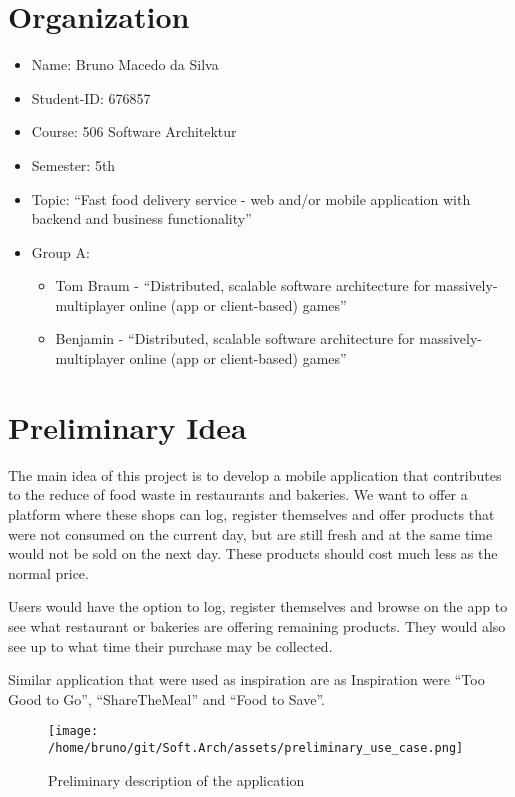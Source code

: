 \documentclass[pdftex, a4paper]{scrartcl}
\begin{document}
\section{Organization}

\begin{itemize}
    \item Name: Bruno Macedo da Silva
    \item Student-ID: 676857
    \item Course: 506 Software Architektur 
    \item Semester: 5th
    \item Topic: ``Fast food delivery service - web and/or mobile application with backend and business functionality''
    \item Group A: 
        \begin{itemize}
            \item Tom Braum - ``Distributed, scalable software architecture for massively-multiplayer online (app or 
            client-based) games''
            \item Benjamin - ``Distributed, scalable software architecture for massively-multiplayer online (app or 
            client-based) games''
        \end{itemize}
\end{itemize}

\section{Preliminary Idea}

The main idea of this project is to develop a mobile application that contributes to the reduce of food waste 
in restaurants and bakeries. We want to offer a platform where these shops can log, register themselves and offer
products that were not consumed on the current day, but are still fresh and at the same time would not be sold on 
the next day. These products should cost much less as the normal price.

Users would have the option to log, register themselves and browse on the app to see what restaurant or bakeries
are offering remaining products. They would also see up to what time their purchase may be collected.

Similar application that were used as inspiration are as Inspiration were ``Too Good to Go'', ``ShareTheMeal'' 
and ``Food to Save''.

\begin{figure}[htb]
    \centering
    \texttt{[image: /home/bruno/git/Soft.Arch/assets/preliminary\_use\_case.png]}
    \caption{Preliminary description of the application}
    \label{fig:predes}
\end{figure}
\end{document}

